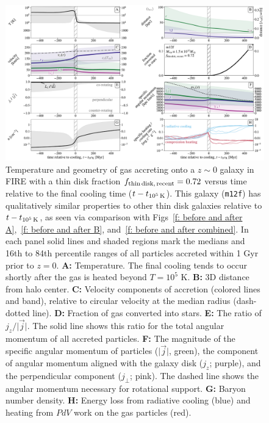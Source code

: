 \documentclass[fleqn,usenatbib]{mnras}
\newcommand{\fthin}{f_{\rm thin\,disk,\,recent}}
\newcommand{\tcools}{t_{10^5\,{\rm K}}}
\begin{document}
\begin{figure}\includegraphics[width=\textwidth]{figures/before_and_after/before_and_after_allone_m12f_md.pdf}
\caption{
Temperature and geometry of gas accreting onto a $z\sim0$ galaxy in FIRE with a thin disk fraction $\fthin=0.72$ versus time relative to the final cooling time ($t - \tcools$).
This galaxy (\texttt{m12f}) has qualitatively similar properties to other thin disk galaxies relative to $t-\tcools$, as seen via comparison with Figs~\ref{f: before and after A},~\ref{f: before and after B}, and~\ref{f: before and after combined}.
In each panel solid lines and shaded regions mark the medians and 16th to 84th percentile ranges of all particles accreted within 1 Gyr prior to $z=0$.
\textbf{A:} Temperature.
The final cooling tends to occur shortly after the gas is heated beyond $T=10^5$ K.
\textbf{B:} 3D distance from halo center.
\textbf{C:} Velocity components of accretion (colored lines and band), relative to circular velocity at the median radius (dash-dotted line).
\textbf{D:} Fraction of gas converted into stars.
\textbf{E:} The ratio of $j_z / \vert \vec j \vert$.
The solid line shows this ratio for the total angular momentum of all accreted particles.
\textbf{F:} The magnitude of the specific angular momentum of particles ($\vert\vec{j}\vert$, green), the component of angular momentum aligned with the galaxy disk ($j_z$; purple), and the perpendicular component ($j_{\perp}$; pink).
The dashed line shows the angular momentum necessary for rotational support.
\textbf{G:} Baryon number density.
\textbf{H:} Energy loss from radiative cooling (blue) and heating from $PdV$ work on the gas particles (red).
}
\label{f: m12f-tcools}
\end{figure}
\end{document}
